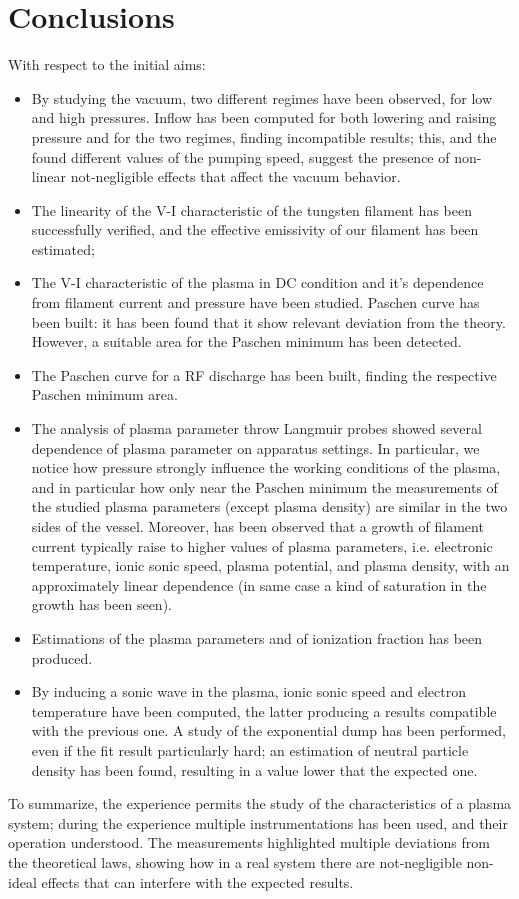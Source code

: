 \documentclass[11pt,a4 paper]{article}
\begin{document}
\section{Conclusions}
With respect to the initial aims:
\begin{itemize}[noitemsep]
  \item By studying the vacuum, two different regimes have been observed, for low and high pressures. Inflow has been computed for both lowering and raising pressure and for the two regimes, finding incompatible results; this, and the found different values of the pumping speed, suggest the presence of non-linear not-negligible effects that affect the vacuum behavior.
  \item The linearity of the V-I characteristic of the tungsten filament has been successfully verified, and the effective emissivity of our filament has been estimated;
  \item The V-I characteristic of the plasma in DC condition and it's dependence from filament current and pressure have been studied. Paschen curve has been built: it has been found that it show relevant deviation from the theory. However, a suitable area for the Paschen minimum has been detected.
  \item The Paschen curve for a RF discharge has been built, finding the respective Paschen minimum area.
  \item The analysis of plasma parameter throw Langmuir probes showed several dependence of plasma parameter on apparatus settings. In particular, we notice how pressure strongly influence the working conditions of the plasma, and in particular how only near the Paschen minimum the measurements of the studied plasma parameters (except plasma density) are similar in the two sides of the vessel. Moreover, has been observed that a growth of filament current typically raise to higher values of plasma parameters, i.e. electronic temperature, ionic sonic speed, plasma potential, and plasma density, with an approximately linear dependence (in same case a kind of saturation in the growth has been seen).
  \item Estimations of the plasma parameters and of ionization fraction has been produced.
  \item By inducing a sonic wave in the plasma, ionic sonic speed and electron temperature have been computed, the latter producing a results compatible with the previous one. A study of the exponential dump has been performed, even if the fit result particularly hard; an estimation of neutral particle density has been found, resulting in a value lower that the expected one.
\end{itemize}
To summarize, the experience permits the study of the characteristics of a plasma system; during the experience multiple instrumentations has been used, and their operation understood. The measurements highlighted multiple deviations from the theoretical laws, showing how in a real system there are not-negligible non-ideal effects that can interfere with the expected results.
\end{document}
